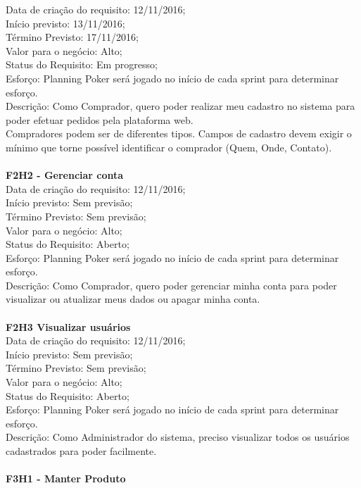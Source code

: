 \begin{apendicesenv}
\tab Data de criação do requisito: 12/11/2016;\\
\tab Início previsto: 13/11/2016;\\
\tab Término Previsto: 17/11/2016;\\
\tab Valor para o negócio: Alto;\\
\tab Status do Requisito: Em progresso;\\
\tab Esforço: Planning Poker será jogado no início de cada sprint para determinar esforço.\\
\tab Descrição: Como Comprador, quero poder realizar meu cadastro no sistema para poder efetuar pedidos pela plataforma web.\\
\tab Compradores podem ser de diferentes tipos. Campos de cadastro devem exigir o mínimo que torne possível identificar o comprador (Quem, Onde, Contato).\\
\\
\textbf{F2H2 - Gerenciar conta}\\
\tab Data de criação do requisito: 12/11/2016;\\
\tab Início previsto: Sem previsão;\\
\tab Término Previsto: Sem previsão;\\
\tab Valor para o negócio: Alto;\\
\tab Status do Requisito: Aberto;\\
\tab Esforço: Planning Poker será jogado no início de cada sprint para determinar esforço.\\
\tab Descrição: Como Comprador, quero poder gerenciar minha conta para poder visualizar ou atualizar meus dados ou apagar minha conta.\\
\\
\textbf{F2H3 Visualizar usuários}\\
\tab Data de criação do requisito: 12/11/2016;\\
\tab Início previsto: Sem previsão;\\
\tab Término Previsto: Sem previsão;\\
\tab Valor para o negócio: Alto;\\
\tab Status do Requisito: Aberto;\\
\tab Esforço: Planning Poker será jogado no início de cada sprint para determinar esforço.\\
\tab Descrição: Como Administrador do sistema, preciso visualizar todos os usuários cadastrados para poder facilmente.\\
\\
\textbf{F3H1 - Manter Produto}\\

\end{apendicesenv}
